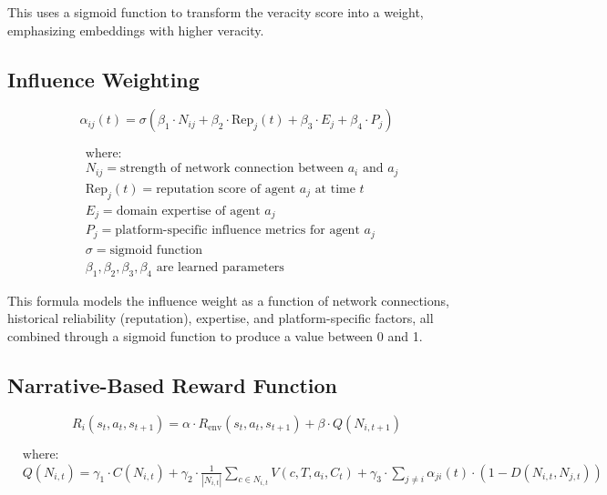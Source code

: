 \documentclass[12pt, a4paper]{article}
\begin{document}
This uses a sigmoid function to transform the veracity score into a weight, emphasizing embeddings with higher veracity.

\subsection{Influence Weighting}


\begin{equation}
\alpha_{ij}(t) = \sigma(\beta_1 \cdot N_{ij} + \beta_2 \cdot \text{Rep}_j(t) + \beta_3 \cdot E_j + \beta_4 \cdot P_j)
\end{equation}

\begin{equation}
\begin{aligned}
& \text{where:} \\
& N_{ij} = \text{strength of network connection between } a_i \text{ and } a_j \\
& \text{Rep}_j(t) = \text{reputation score of agent } a_j \text{ at time } t \\
& E_j = \text{domain expertise of agent } a_j \\
& P_j = \text{platform-specific influence metrics for agent } a_j \\
& \sigma = \text{sigmoid function} \\
& \beta_1, \beta_2, \beta_3, \beta_4 \text{ are learned parameters}
\end{aligned}
\end{equation}

This formula models the influence weight as a function of network connections, historical reliability (reputation), expertise, and platform-specific factors, all combined through a sigmoid function to produce a value between 0 and 1.

\subsection{Narrative-Based Reward Function}


\begin{equation}
R_i(s_t, a_t, s_{t+1}) = \alpha \cdot R_{\text{env}}(s_t, a_t, s_{t+1}) + \beta \cdot Q(N_{i,t+1})
\end{equation}

\begin{equation}
\begin{aligned}
& \text{where:} \\
& Q(N_{i,t}) = \gamma_1 \cdot C(N_{i,t}) + \gamma_2 \cdot \frac{1}{|N_{i,t}|} \sum_{c \in N_{i,t}} V(c, T, a_i, C_t) + \gamma_3 \cdot \sum_{j \neq i} \alpha_{ji}(t) \cdot (1 - D(N_{i,t}, N_{j,t}))
\end{aligned}
\end{equation}
\end{document}
